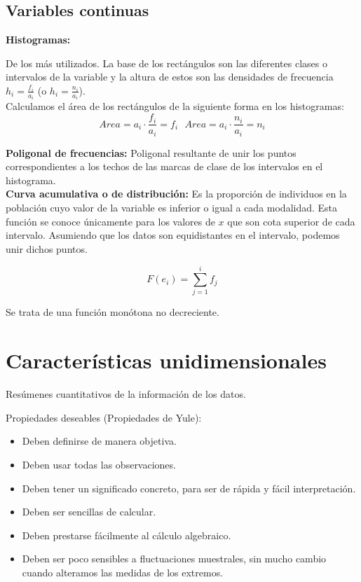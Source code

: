 \subsection{Variables continuas}
 \textbf{Histogramas:}

De los más utilizados.
La base de los rectángulos son las diferentes clases o intervalos de la variable y la altura de estos son las densidades de frecuencia $h_i = \frac{f_i}{a_i}$ (o $h_i = \frac{n_i}{a_i}$). \\


Calculamos el área de los rectángulos de la siguiente forma en los histogramas:
$$Area = a_i \cdot \dfrac{f_i}{a_i} = f_i \ \ \ Area = a_i \cdot \dfrac{n_i}{a_i} = n_i$$


\textbf{Poligonal de frecuencias:} Poligonal resultante de unir los puntos correspondientes a los techos de las marcas de clase de los intervalos en el histograma.\\


\textbf{Curva acumulativa o de distribución:} Es la proporción de individuos en la población cuyo valor de la
variable es inferior o igual a cada modalidad. Esta función se conoce únicamente para los valores de $x$ que son
cota superior de cada intervalo. Asumiendo que los datos son equidistantes en el intervalo, podemos unir dichos puntos.

$$F(e_i)=\sum_{j=1}^i f_j$$

Se trata de una función monótona no decreciente.

\section{Características unidimensionales}

Resúmenes cuantitativos de la información de los datos.

Propiedades deseables (Propiedades de Yule):
\begin{itemize}
    \item Deben definirse de manera objetiva.
    \item Deben usar todas las observaciones.
    \item Deben tener un significado concreto, para ser de rápida y fácil interpretación.
    \item Deben ser sencillas de calcular.
    \item Deben prestarse fácilmente al cálculo algebraico.
    \item Deben ser poco sensibles a fluctuaciones muestrales, sin mucho cambio cuando alteramos las medidas de los extremos.
\end{itemize}

